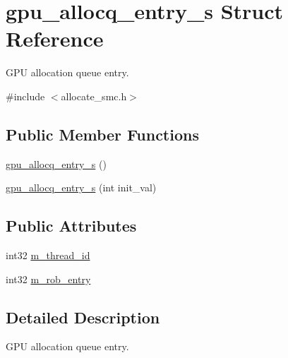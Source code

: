\hypertarget{structgpu__allocq__entry__s}{
\section{gpu\_\-allocq\_\-entry\_\-s Struct Reference}
\label{structgpu__allocq__entry__s}
}


GPU allocation queue entry.  




{\ttfamily \#include $<$allocate\_\-smc.h$>$}

\subsection*{Public Member Functions}
\begin{DoxyCompactItemize}
\item 
\hyperlink{structgpu__allocq__entry__s_a2f64ffb8a7ca71d5911edcaa34b2ae08}{gpu\_\-allocq\_\-entry\_\-s} ()
\item 
\hyperlink{structgpu__allocq__entry__s_ab052036edbaa273dcec326b463f6a45f}{gpu\_\-allocq\_\-entry\_\-s} (int init\_\-val)
\end{DoxyCompactItemize}
\subsection*{Public Attributes}
\begin{DoxyCompactItemize}
\item 
int32 \hyperlink{structgpu__allocq__entry__s_a70a3a6951c998245605344425cfe4b67}{m\_\-thread\_\-id}
\item 
int32 \hyperlink{structgpu__allocq__entry__s_a09e33439833674031bf509a1ffe42fff}{m\_\-rob\_\-entry}
\end{DoxyCompactItemize}


\subsection{Detailed Description}
GPU allocation queue entry. 

